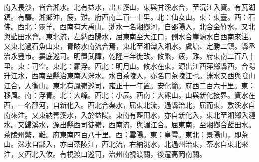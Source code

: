 \begin{pinyinscope}
南入長沙，皆合湘水。北有益水，出五溪山，東與甘溪水合，至沅江入資。有瓦湖鎮。有驛。湘鄉沖，疲，難。府西南二百一十里。北：仙女山。東：東臺。西：石佛。西北：靈羊。西南有大禹山。漣水一名湘鄉河，自邵陽入，北合金竹水，又北與藍田水會。東北流，左納西陽水，屈東南至大江口，側水合崖源水自西南來注。又東北過石魚山東，青陂水南流合焉，東北至湘潭入湘水。虞塘、定勝二鎮。縣丞治永豐市。婁底巡司。明置武障，乾隆三年徙改。攸繁，疲，難。府東南二百八十里。東：司空。東北：羅浮。西北：明月山。攸水在東，源出江西萍鄉縣西，合陽升江水，西南至縣治東南入洣水。水自茶陵入，亦名曰茶陵江也。洣水又西與陰山江合，入衡山。東北有鳳嶺巡司，雍正十一年置。安化簡。府西二百六十里。東：移風。南：浮青。北：大峰。西北：小辰。西南：大熊山。山與新化接界。資水在西，一名邵河，自新化入。西北合渠水，屈東北流，過縣治北，屈而東，敷溪水自南來注。又東納善溪水，入於益陽。東南有藍田水，亦自新化入，東北至湘鄉入漣水。又歸溪水，源出縣西司徒嶺，西南流，與湄江合。屈東南，至湘鄉合藍田水。茶陵州繁，難。府東南四百八十里。西：雲陽。東：皇雩。東北：景陽山，即茶山。洣水自酃入，亦曰茶陵江，西北流，右納洮水，北過州治東，茶水自東北來注，又西北入攸。有視渡口巡司，治州南視渡關，後遷高岡南關。


\end{pinyinscope}
